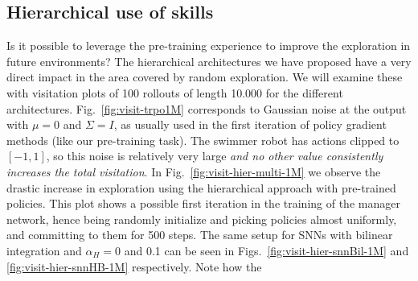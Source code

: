 \documentclass{article} %
\begin{document}
\subsection{Hierarchical use of skills}

Is it possible to leverage the pre-training experience to improve the exploration in future environments? The hierarchical architectures we have proposed have a very direct impact in the area covered by random exploration. We will examine these with visitation plots of 100 rollouts of length 10.000 for the different architectures. Fig.\ \ref{fig:visit-trpo1M} corresponds to Gaussian noise at the output with $\mu=0$ and $\Sigma=I$, as usually used in the first iteration of policy gradient methods (like our pre-training task). The swimmer robot has actions clipped to $[-1,1]$, so this noise is relatively very large \textit{and no other value consistently increases the total visitation}. In Fig.\ \ref{fig:visit-hier-multi-1M} we observe the drastic increase in exploration using the hierarchical approach with pre-trained policies. This plot shows a possible first iteration in the training of the manager network, hence being randomly initialize and picking policies almost uniformly, and committing to them for 500 steps. The same setup for SNNs with bilinear integration and $\alpha_H= 0$ and 0.1 can be seen in Figs.\ \ref{fig:visit-hier-snnBil-1M} and \ref{fig:visit-hier-snnHB-1M} respectively. Note how the 
\end{document}
